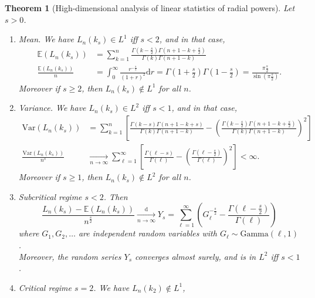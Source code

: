 \documentclass[10pt,reqno]{amsart}
\numberwithin{equation}{section}
\numberwithin{figure}{section}
\theoremstyle{plain}
\newtheorem{theorem}{Theorem}[section]
\newcommand{\<}{\langle}
\renewcommand{\>}{\rangle}
\begin{document}
\begin{theorem}[High-dimensional analysis of linear statistics of radial
  powers]\label{th:radial-powers}
  Let $s>0$.
  \begin{enumerate}[label=\textup{(\roman*)}]
  \item \emph{Mean.}
   We have $L_n(k_s)\in L^1$ iff $s<2$, and in that case, 
    \begin{align*}
      \mathbb{E}(L_n(k_s))
      &=
      \sum_{k=1}^n
      \frac{\Gamma(k-\frac{s}{2})\Gamma(n+1-k+\frac{s}{2})}
      {\Gamma(k)\Gamma(n+1-k)}\\
      \frac{\mathbb{E}(L_n(k_s))}{n}
      &=%
        \int_0^\infty \frac{r^{-\frac{s}{2}}}{(1+r)^2}\mathrm{d}r
        =
        \Gamma(1+\tfrac{s}{2})\Gamma(1-\tfrac{s}{2})
        =
        \frac{\pi\frac{s}{2}}{\sin(\pi\frac{s}{2})}.
    \end{align*}
    Moreover if $s\ge2$, then $L_n(k_s)\not\in L^1$ for all $n$.
  \item \emph{Variance.} We have $L_n(k_s)\in L^2$ iff $s<1$,
    and in that case, 
    \begin{align*}
      \mathrm{Var}(L_n(k_s))
      &=
        \sum_{k=1}^n
        \left[
        \frac{\Gamma(k-s)\Gamma(n+1-k+s)}
        {\Gamma(k)\Gamma(n+1-k)}
        -
        \left(
        \frac{\Gamma(k-\frac{s}{2})\Gamma(n+1-k+\frac{s}{2})}
        {\Gamma(k)\Gamma(n+1-k)}
        \right)^2
        \right]
        \\
      \frac{\mathrm{Var}(L_n(k_s))}{n^s}
      &\xrightarrow[n\to\infty]{}
      \sum_{\ell=1}^{\infty}
      \left[
      \frac{\Gamma(\ell-s)}{\Gamma(\ell)}
      -
      \left(
      \frac{\Gamma(\ell-\frac{s}{2})}{\Gamma(\ell)}
      \right)^2
      \right]
      <\infty.
      \end{align*}
      Moreover if $s\ge1$, then $L_n(k_s)\not\in L^2$ for all $n$.
    \item \emph{Subcritical regime $s<2$.}
      Then
      \[
        \frac{L_n(k_s)-\mathbb{E}(L_n(k_s))}{n^{\frac{s}{2}}}
        \xrightarrow[n\to\infty]{\mathrm d}
        Y_s=
        \sum_{\ell=1}^{\infty}
        \left(
          G_\ell^{-\frac{s}{2}}
          -
          \frac{\Gamma(\ell-\frac{s}{2})}{\Gamma(\ell)}
        \right)
      \]
      where $G_1,G_2,\ldots$ are independent random variables with
      $G_\ell\sim\mathrm{Gamma}(\ell,1)$.\\ Moreover, the random series $Y_s$ converges
      almost surely, and is in $L^2$ iff $s<1$. 
    \item \emph{Critical regime $s=2$.} We have $L_n(k_2)\not\in L^1$,

\end{enumerate}
\end{theorem}
\end{document}
